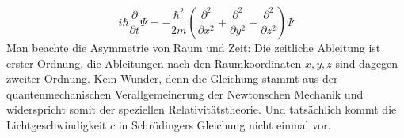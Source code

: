 \begin{equation*}\label{eq:schroedinger}
  i\hbar\frac{\partial}{\partial t}\Psi=-\frac{\hbar^2}{2m}(\frac{\partial^2}{\partial x^2}+\frac{\partial^2}{\partial y^2}+\frac{\partial^2}{\partial z^2})\Psi
\end{equation*}
%
Man beachte die Asymmetrie von Raum und Zeit: Die zeitliche Ableitung ist erster Ordnung, die Ableitungen nach den Raumkoordinaten $x,y,z$ sind dagegen zweiter Ordnung. Kein Wunder, denn die Gleichung stammt aus der quantenmechanischen Verallgemeinerung der Newtonschen Mechanik und widerspricht somit der speziellen Relativitätstheorie. Und tatsächlich kommt die Lichtgeschwindigkeit $c$ in Schrödingers Gleichung nicht einmal vor.
